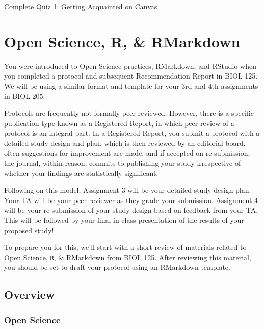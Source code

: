 \documentclass[
]{book}
\begin{document}
Complete Quiz 1: Getting Acquainted on \href{https://canvas.ubc.ca/courses/113910}{Canvas}

\hypertarget{open-science-r-rmarkdown}{%
\chapter*{Open Science, R, \& RMarkdown}\label{open-science-r-rmarkdown}}

You were introduced to Open Science practices, RMarkdown, and RStudio when you completed a protocol and subsequent Recommendation Report in BIOL 125. We will be using a similar format and template for your 3rd and 4th assignments in BIOL 205.

Protocols are frequently not formally peer-reviewed. However, there is a specific publication type known as a Registered Report, in which peer-review of a protocol is an integral part. In a Registered Report, you submit a protocol with a detailed study design and plan, which is then reviewed by an editorial board, often suggestions for improvement are made, and if accepted on re-submission, the journal, within reason, commits to publishing your study irrespective of whether your findings are statistically significant.

Following on this model, Assignment 3 will be your detailed study design plan. Your TA will be your peer reviewer as they grade your submission. Assignment 4 will be your re-submission of your study design based on feedback from your TA. This will be followed by your final in class presentation of the results of your proposed study!

To prepare you for this, we'll start with a short review of materials related to Open Science, \texttt{R}, \& RMarkdown from BIOL 125. After reviewing this material, you should be set to draft your protocol using an RMarkdown template.

\hypertarget{overview-1}{%
\section*{Overview}\label{overview-1}}

\hypertarget{open-science}{%
\subsection*{Open Science}\label{open-science}}
\end{document}
